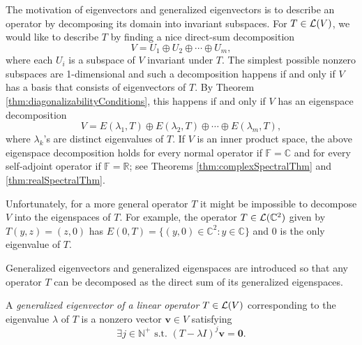 \begin{rem}
  The motivation of eigenvectors and generalized eigenvectors
  is to describe an operator by decomposing its domain
  into invariant subspaces.
  For $T\in {\cal L}(V)$, we would like to describe $T$
  by finding a nice direct-sum decomposition
  \begin{displaymath}
     V = U_1 \oplus U_2 \oplus \cdots \oplus U_m,
  \end{displaymath}
  where each $U_i$ is a subspace of $V$ invariant under $T$.
  The simplest possible nonzero subspaces are 1-dimensional
  and such a decomposition happens if and only if
  $V$ has a basis that consists of eigenvectors of $T$.
  By Theorem \ref{thm:diagonalizabilityConditions},
  this happens if and only if $V$ has an eigenspace decomposition
  \begin{displaymath}
    V = E(\lambda_1, T) \oplus E(\lambda_2, T)
    \oplus \cdots \oplus E(\lambda_m, T),
  \end{displaymath}
  where $\lambda_k$'s are distinct eigenvalues of $T$.
  If $V$ is an inner product space,
  the above eigenspace decomposition holds
  for every normal operator if $\mathbb{F}=\mathbb{C}$
  and for every self-adjoint operator if $\mathbb{F}=\mathbb{R}$;
  see Theorems \ref{thm:complexSpectralThm}
  and \ref{thm:realSpectralThm}.

  Unfortunately, for a more general operator $T$
  it might be impossible to decompose
  $V$ into the eigenspaces of $T$.
  For example, the operator $T\in {\cal L}(\mathbb{C}^2)$
  given by $T(y,z)=(z,0)$ has
  $E(0,T)=\{(y,0)\in\mathbb{C}^2: y\in \mathbb{C}\}$
  and $0$ is the only eigenvalue of $T$.

  Generalized eigenvectors and generalized eigenspaces
  are introduced so that any operator $T$
  can be decomposed as the direct sum
  of its generalized eigenspaces.
\end{rem}

\begin{defn}
  \label{def:generalizedEigenvector}
  A \emph{generalized eigenvector of a linear operator}
  $T\in{\cal L}(V)$ corresponding to the eigenvalue $\lambda$ of $T$
  is a nonzero vector $\mathbf{v}\in V$ satisfying
  \begin{equation}
    \label{eq:generalizedEigenvector}
    \exists j\in \mathbb{N}^+     \text{ s.t. } 
    (T-\lambda I)^j \mathbf{v} = \mathbf{0}.
  \end{equation}
\end{defn}

